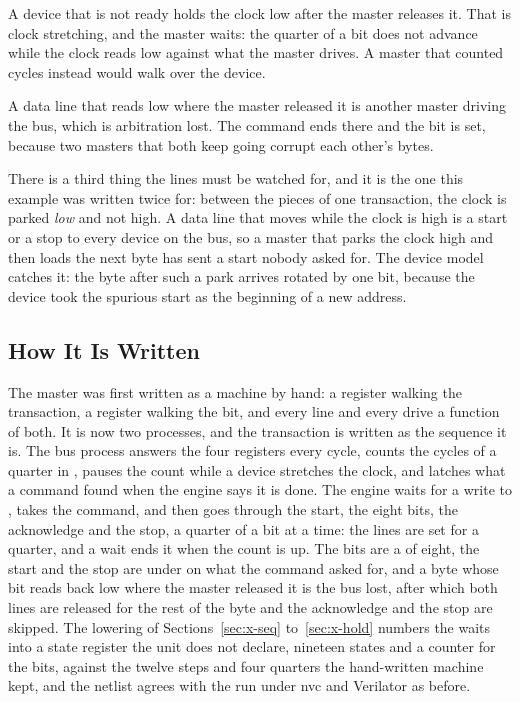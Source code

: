 A device that is not ready holds the clock low after the master
releases it. That is clock stretching, and the master waits: the
quarter of a bit does not advance while the clock reads low against
what the master drives. A master that counted cycles instead would
walk over the device.

A data line that reads low where the master released it is another
master driving the bus, which is arbitration lost. The command ends
there and the bit is set, because two masters that both keep going
corrupt each other's bytes.

There is a third thing the lines must be watched for, and it is the
one this example was written twice for: between the pieces of one
transaction, the clock is parked \emph{low} and not high. A data line
that moves while the clock is high is a start or a stop to every
device on the bus, so a master that parks the clock high and then
loads the next byte has sent a start nobody asked for. The device
model catches it: the byte after such a park arrives rotated by one
bit, because the device took the spurious start as the beginning of a
new address.

\subsection{How It Is Written}

The master was first written as a machine by hand: a 
register walking the transaction, a  register walking
the bit, and every line and every drive a function of both. It is
now two processes, and the transaction is written as the sequence it
is. The bus process answers the four registers every cycle, counts
the cycles of a quarter in , pauses the count while a
device stretches the clock, and latches what a command found when
the engine says it is done. The engine waits for a write to
, takes the command, and then goes through the start, the
eight bits, the acknowledge and the stop, a quarter of a bit at a
time: the lines are set for a quarter, and a wait ends it when the
count is up. The bits are a  of eight, the start and the
stop are under  on what the command asked for, and a byte
whose bit reads back low where the master released it is the bus
lost, after which both lines are released for the rest of the byte
and the acknowledge and the stop are skipped. The lowering of
Sections~\ref{sec:x-seq} to~\ref{sec:x-hold} numbers the waits into a
state register the unit does not declare, nineteen states and a
counter for the bits, against the twelve steps and four quarters the
hand-written machine kept, and the netlist agrees with the run under
nvc and Verilator as before.

